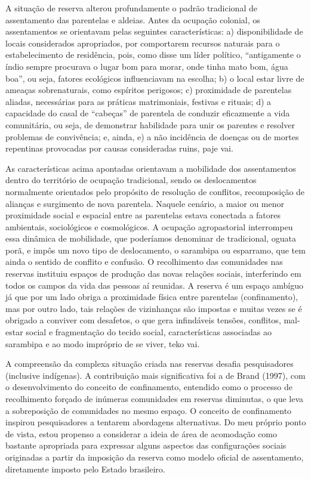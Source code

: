 A situação de reserva alterou profundamente o padrão tradicional de
assentamento das parentelas e aldeias. Antes da ocupação colonial, os
assentamentos se orientavam pelas seguintes características: a)
disponibilidade de locais considerados apropriados, por comportarem
recursos naturais para o estabelecimento de residência, pois, como
disse um líder político, ``antigamente o índio sempre procurava o lugar
bom para morar, onde tinha mato bom, água boa'', ou seja, fatores
ecológicos influenciavam na escolha; b) o local estar livre de ameaças
sobrenaturais, como espíritos perigosos; c) proximidade de parentelas
aliadas, necessárias para as práticas matrimoniais, festivas e rituais;
d) a capacidade do casal de ``cabeças'' de parentela de conduzir
eficazmente a vida comunitária, ou seja, de demonstrar habilidade para
unir os parentes e resolver problemas de convivência; e, ainda, e) a
não incidência de doenças ou de mortes repentinas provocadas por causas
consideradas ruins, paje vai.

As características acima apontadas orientavam a mobilidade dos
assentamentos dentro do território de ocupação tradicional, sendo os
deslocamentos normalmente orientados pelo propósito de resolução de
conflitos, recomposição de alianças e surgimento de nova parentela.
Naquele cenário, a maior ou menor proximidade social e espacial entre
as parentelas estava conectada a fatores ambientais, sociológicos e
cosmológicos. A ocupação agropastorial interrompeu essa dinâmica de
mobilidade, que poderíamos denominar de tradicional, oguata porã, e
impôs um novo tipo de deslocamento, o sarambipa ou esparramo, que tem
ainda o sentido de conflito e confusão. O recolhimento das comunidades
nas reservas instituiu espaços de produção das novas relações sociais,
interferindo em todos os campos da vida das pessoas aí reunidas. A
reserva é um espaço ambíguo já que por um lado obriga a proximidade
física entre parentelas (confinamento), mas por outro lado, tais
relações de vizinhanças são impostas e muitas vezes se é obrigado a
conviver com desafetos, o que gera infindáveis tensões, conflitos,
mal-estar social e fragmentação do tecido social, características
associadas ao sarambipa e ao modo impróprio de se viver, teko vai.

A compreensão da complexa situação criada nas reservas desafia
pesquisadores (inclusive indígenas). A contribuição mais significativa
foi a de Brand (1997), com o desenvolvimento do conceito de confinamento,
entendido como o processo de recolhimento forçado de inúmeras
comunidades em reservas diminutas, o que leva a sobreposição de
comunidades no mesmo espaço. O conceito de confinamento inspirou
pesquisadores a tentarem abordagens alternativas. Do meu próprio ponto
de vista, estou propenso a considerar a ideia de área de acomodação
como bastante apropriada para expressar alguns aspectos das
configurações sociais originadas a partir da imposição da reserva como
modelo oficial de assentamento, diretamente imposto pelo Estado
brasileiro. 

